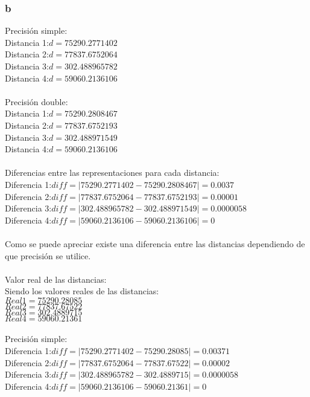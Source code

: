 \documentclass[a4paper,11pt]{article}
\begin{document}
\subsubsection{b}

Precisión simple:\\
Distancia 1:$ d=75290.2771402$\\
Distancia 2:$ d=77837.6752064$\\
Distancia 3:$ d=302.488965782$\\
Distancia 4:$ d=59060.2136106$\\
\\
Precisión double:\\
Distancia 1:$ d=75290.2808467$\\
Distancia 2:$ d=77837.6752193$\\
Distancia 3:$ d=302.488971549$\\
Distancia 4:$ d=59060.2136106$\\
\\
Diferencias entre las representaciones para cada distancia:\\
Diferencia 1:$diff=|75290.2771402-75290.2808467|=0.0037$\\
Diferencia 2:$diff=|77837.6752064-77837.6752193|=0.00001$\\
Diferencia 3:$diff=|302.488965782-302.488971549|=0.0000058$\\
Diferencia 4:$diff=|59060.2136106-59060.2136106|=0$\\
\\
Como se puede apreciar existe una diferencia entre las distancias dependiendo de que precisión se utilice.\\ 
\\
Valor real de las distancias:\\
Siendo los valores reales de las distancias:\\
$Real1=75290.28085$\\
$Real2=77837.67522$\\
$Real3=302.4889715$\\
$Real4=59060.21361$\\
\\
Precisión simple:\\
Diferencia 1:$diff=|75290.2771402-75290.28085|=0.00371$\\
Diferencia 2:$diff=|77837.6752064-77837.67522|=0.00002$\\
Diferencia 3:$diff=|302.488965782-302.4889715|=0.0000058$\\
Diferencia 4:$diff=|59060.2136106-59060.21361|=0$\\
\end{document}

